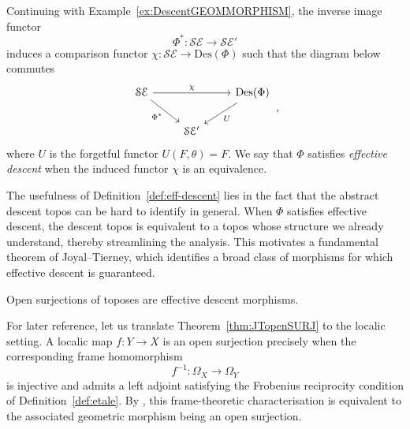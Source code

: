 \documentclass[a4paper, 11pt,reqno]{amsart}
\newcommand{\baseS}{\mathcal{S}}
\newcommand{\Des}{\mathrm{Des}}
\newcommand{\E}{\mathcal{E}}
\begin{document}
\begin{definition}\label{def:eff-descent} Continuing with Example~\ref{ex:DescentGEOMMORPHISM}, the inverse image functor
	\begin{equation}
	\Phi^*\colon \baseS\E\rightarrow \baseS\E'
	\end{equation}
induces a comparison functor $\chi\colon \baseS\E\rightarrow \Des(\Phi)$ such that the diagram below commutes
	\begin{equation}
	\begin{tikzcd}
	\baseS\E \ar[rr,"\chi"] \ar[dr,swap,"\Phi^*"] && \Des(\Phi) \ar[dl,"U"]\\
	& \baseS\E'
	\end{tikzcd}\,,
	\end{equation}
where $U$ is the forgetful functor $U(F,\theta)=F$. %
 We say that $\Phi$ satisfies \emph{effective descent}  when the induced functor $\chi$ is an equivalence.
\end{definition}

The usefulness of Definition~\ref{def:eff-descent} lies in the fact that the abstract descent topos can be hard to identify in general. When $\Phi$ satisfies effective descent, the descent topos is equivalent to a topos whose structure we already understand, thereby streamlining the analysis. This motivates a fundamental theorem of Joyal--Tierney, which identifies a broad class of morphisms for which effective descent is guaranteed.
\begin{theorem}\label{thm:JTopenSURJ} Open surjections of toposes are effective descent morphisms. 
\end{theorem}

\begin{remark}\label{rem:openSURJ} For later reference, let us translate Theorem~\ref{thm:JTopenSURJ} to the localic setting. A localic map $f\colon Y\to X$ is an open surjection precisely when the corresponding frame homomorphism 
$$f^{-1}\colon \Omega_X \to \Omega_Y$$
is injective and admits a left adjoint satisfying the Frobenius reciprocity condition of Definition~\ref{def:etale}. By \cite[Prop.~C1.5.1 and Theorem~C1.5.4]{Elephant}, this frame-theoretic characterisation is equivalent to the associated geometric morphism being an open surjection.
\end{remark}
\end{document}
